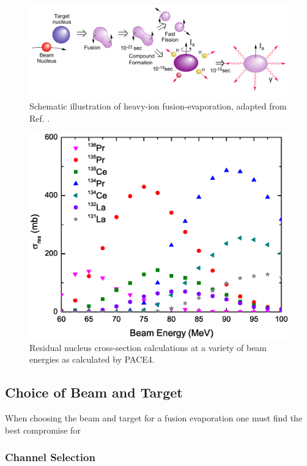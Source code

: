 \begin{figure}[h!]
	\centerline{\includegraphics[width=\textwidth]{./img/c3/fusion_evaporation_horizontal.pdf}}
	\caption{Schematic illustration of heavy-ion fusion-evaporation, adapted from Ref. \cite{gsBooklet}.}
	\label{fig:chp3-fus-evap-schem}
\end{figure}

\begin{figure}[h!]
	\centerline{\includegraphics[width=\textwidth]{./img/c3/135Pr_calc_plot.eps}}
	\caption{Residual nucleus cross-section calculations at a variety of beam energies as calculated by PACE4.}
	\label{fig:chp3-pace4-calc}
\end{figure}

\subsection{Choice of Beam and Target}
\label{ssec:exp-pr-fus-evap-beam-target}
When choosing the beam and target for a fusion evaporation one must find the best compromise for 
\subsubsection{Channel Selection}
\label{sssec:exp-pr-fus-evap-beam-target-channel}
